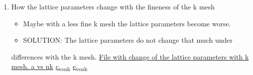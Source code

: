 \documentclass[11pt]{article}
\begin{document}
\begin{enumerate}
\item How the lattice parameters change with the fineness of the k mesh
\label{sec:orgdaf3990}
\begin{itemize}
\item Maybe with a less fine k mesh the lattice parameters become
worse.
\item SOLUTION: The lattice parameters do not change that much under
\end{itemize}
differences with the k mesh. \href{file:///home/tigany/Documents/disl\_gsurf/hcp\_pris\_screw/hcp\_relaxed\_pris\_screw/gamma\_surfaces/get\_hom\_shear\_bc\_gs.py}{File with change of the lattice
parameters with k mesh. }
\href{file:///home/tigany/Documents/disl\_gsurf/hcp\_pris\_screw/hcp\_relaxed\_pris\_screw/gamma\_surfaces/a\_hcp\_vs\_nk.png}{a vs nk}
\href{file:///home/tigany/Documents/disl\_gsurf/hcp\_pris\_screw/hcp\_relaxed\_pris\_screw/gamma\_surfaces/c\_hcp\_vs\_nk.png}{c\textsubscript{vs}\textsubscript{nk}}
\href{file:///home/tigany/Documents/disl\_gsurf/hcp\_pris\_screw/hcp\_relaxed\_pris\_screw/gamma\_surfaces/e\_hcp\_vs\_nk.png}{e\textsubscript{vs}\textsubscript{nk}}


\end{enumerate}
\end{document}
